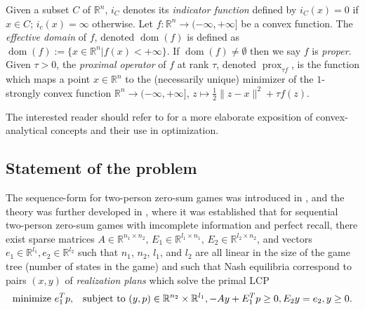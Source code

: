 \documentclass{article} %
\DeclareMathOperator{\dom}{dom}
\DeclareMathOperator{\prox}{prox}
\begin{document}
Given a subset $C$ of $\mathbb{R}^n$,
$i_C$ denotes its \textit{indicator function} defined by $i_C(x) = 0$
if $ x \in C$; $i_c(x) = \infty$ otherwise.
Let $f : \mathbb{R}^n \rightarrow (-\infty, +\infty]$ be a convex
  function.
The \textit{effective domain} of $f$, denoted $\dom(f)$ is defined as
$\dom(f) := \{x \in \mathbb{R}^n | f(x) < +\infty\}$. If $\dom(f) \ne
\emptyset$ then we say $f$ is \textit{proper}.
Given $\tau > 0$, the \textit{proximal operator}
of $f$ at rank $\tau$, denoted $\prox_{\tau f}$, is the
function which maps a point $x \in \mathbb{R}^n$ to the (necessarily
unique) minimizer of the $1$-strongly convex function $\mathbb{R}^n
\rightarrow (-\infty,+\infty]$, $z\mapsto \frac{1}{2}\|z - x\|^2 +
  \tau f(z)$.

The interested reader should refer to
\cite{rockafellar1997convex,combettes2011proximal} for a more
elaborate exposition of convex-analytical concepts and their use in
optimization.

\subsection{Statement of the problem}
The sequence-form for two-person zero-sum games was introduced in
\cite{koller1992complexity}, and the theory was further developed in
\cite{von1996efficient,vonequilibrium}, where it was established that
for sequential two-person zero-sum games with imcomplete information
and perfect recall, there exist sparse matrices $A \in \mathbb{R}^{n_1
  \times n_2}$, $E_1 \in \mathbb{R}^{l_1 \times n_1}$, $E_2 \in
\mathbb{R}^{l_2 \times n_2}$, and vectors $e_1 \in \mathbb{R}^{l_1},
e_2 \in \mathbb{R}^{l_2}$ such that $n_1$, $n_2$, $l_1$, and $l_2$ are
all linear in the size of the game tree (number of states in the game)
and such that Nash equilibria correspond to pairs $(x, y)$ of
\textit{realization plans} which solve the primal LCP
\begin{equation}
  \begin{aligned}
     \text{minimize }e_1^Tp, \hspace{.5em}\text{ subject to }(y,p) \in
     \mathbb{R}^{n_2} \times \mathbb{R}^{l_1}, -Ay +
    E_1^Tp \geq 0, E_2y = e_2, y \ge 0.
  \end{aligned}
  \label{eq:primal_pb}
\end{equation}
\end{document}
